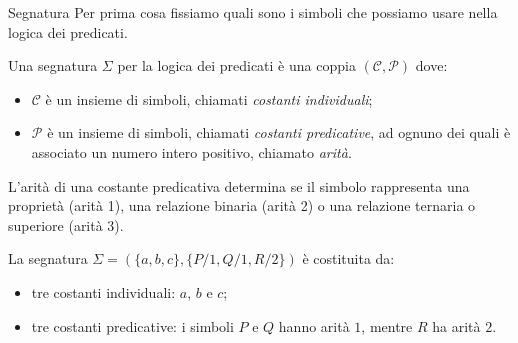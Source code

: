 \documentclass[aspectratio=169,10pt,dvipsnames,xcolor=table,handout]{beamer}
\begin{document}
\begin{frame}{Segnatura}
    Per prima cosa fissiamo quali sono i simboli che possiamo usare nella logica dei predicati.
    \pause

    \begin{definition}[Segnatura]
        Una segnatura $\Sigma$ per la logica dei predicati è una coppia $(\mathcal{C}, \mathcal{P})$ dove:
        \begin{itemize}
            \item $\mathcal C$ è un insieme di simboli, chiamati \emph{costanti individuali};
            \item $\mathcal P$ è un insieme di simboli, chiamati \emph{costanti predicative}, ad ognuno dei quali è associato un numero intero positivo, chiamato \emph{arità}.
        \end{itemize}
    \end{definition}

    \pause
    L'arità di una costante predicativa determina se il simbolo rappresenta una proprietà (arità 1), una relazione binaria (arità 2) o una relazione ternaria o superiore (arità 3).

    \pause
    \begin{example}
        La segnatura $\Sigma = (\{a, b, c\}, \{P/1, Q/1, R/2\})$ è costituita da:
        \begin{itemize}
            \item tre costanti individuali: $a$, $b$ e $c$;
            \item tre costanti predicative: i simboli $P$ e $Q$ hanno arità $1$, mentre $R$ ha arità $2$.
        \end{itemize}
    \end{example}
\end{frame}
\end{document}
